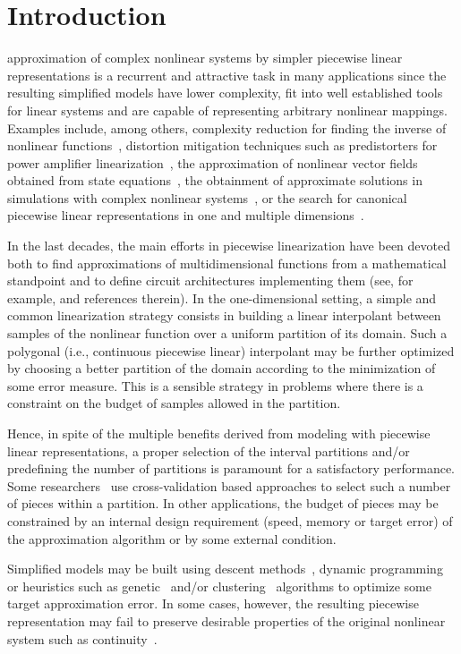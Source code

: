 \documentclass[a4paper,english]{IEEEtran}
\begin{document}
\section{Introduction}

 approximation of complex nonlinear systems
by simpler piecewise linear representations is a recurrent and attractive
task in many applications since the resulting simplified models have
lower complexity, fit into well established tools for linear systems
and are capable of representing arbitrary nonlinear mappings. Examples
include, among others, complexity reduction for finding the inverse
of nonlinear functions~\cite{Hatanaka2002,Tanjad2011}, distortion
mitigation techniques such as predistorters for power amplifier linearization~\cite{Cavers1999,Ba2008},
the approximation of nonlinear vector fields obtained from state equations~\cite{Belkhouche2005},
the obtainment of approximate solutions in simulations with complex
nonlinear systems~\cite{Storace2004}, or the search for canonical
piecewise linear representations in one and multiple dimensions~\cite{Julian1999}.

In the last decades, the main efforts in piecewise linearization have
been devoted both to find approximations of multidimensional functions
from a mathematical standpoint and to define circuit architectures
implementing them (see, for example, \cite{Brox2013} and references
therein). In the one-dimensional setting, a simple and common linearization
strategy consists in building a linear interpolant between samples
of the nonlinear function over a uniform partition of its domain.
Such a polygonal (i.e., continuous piecewise linear) interpolant may
be further optimized by choosing a better partition of the domain
according to the minimization of some error measure. This is a sensible
strategy in problems where there is a constraint on the budget of
samples allowed in the partition. 

Hence, in spite of the multiple benefits derived from modeling with
piecewise linear representations, a proper selection of the interval
partitions and/or predefining the number of partitions is paramount
for a satisfactory performance. Some researchers~\cite{Tanjad2011}
use cross-validation based approaches to select such a number of pieces
within a partition. In other applications, the budget of pieces may
be constrained by an internal design requirement (speed, memory or
target error) of the approximation algorithm or by some external condition.

Simplified models may be built using descent methods~\cite{Usow1967},
dynamic programming~\cite{Bellman1969} or heuristics such as genetic~\cite{Hatanaka2002}
and/or clustering~\cite{Ghosh2011} algorithms to optimize some target
approximation error. In some cases, however, the resulting piecewise
representation may fail to preserve desirable properties of the original
nonlinear system such as continuity~\cite{Hatanaka2002}.
\end{document}
